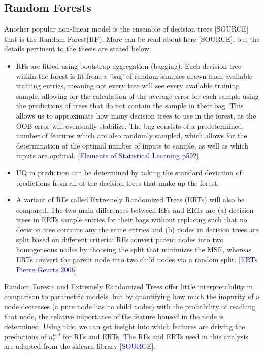 \documentclass[a4paper, twoside, final, 12pt]{article}
\begin{document}
\subsection{Random Forests}
Another popular non-linear model is the ensemble of decision trees [SOURCE] that is the Random Forest(RF). More can be read about here [SOURCE], but the details pertinent to the thesis are stated below:
\begin{itemize}
	\item RFs are fitted using bootstrap aggregation (bagging). Each decision tree within the forest is fit from a 'bag' of random samples drawn from available training entries, meaning not every tree will see every available training sample, allowing for the calculation of the average error for each sample using the predictions of trees that do not contain the sample in their bag. This allows us to approximate how many decision trees to use in the forest, as the OOB error will eventually stabilize. The bag consists of a predetermined number of features which are also randomly sampled, which allows for the determination of the optimal number of inputs to sample, as well as which inputs are optimal.  [\textcolor{blue}{Elements of Statistical Learning p592}]
	\item UQ in prediction can be determined by taking the standard deviation of predictions from all of the decision trees that make up the forest. 
	\item A variant of RFs called Extremely Randomized Trees (ERTs) will also be compared. The two main differences between RFs and ERTs are (a) decision trees in ERTs sample entries for their bags without replacing such that no decision tree contains any the same entries and (b) nodes in decision trees are split based on different criteria; RFs convert parent nodes into two homogeneous nodes by choosing the split that minimizes the MSE, whereas ERTs convert the parent node into two child nodes via a random split. [\textcolor{blue}{ERTs Pierre Geurts 2006}]
\end{itemize}

Random Forests and Extremely Randomized Trees offer little interpretability in comparison to parametric models, but by quantifying how much the impurity of a node decreases (a pure node has no child nodes) with the probability of reaching that node, the relative importance of the feature housed in the node is determined. Using this, we can get insight into which features are driving the predictions of $n_e^{ped}$ for RFs and ERTs. The RFs and ERTs used in this analysis are adapted from the sklearn library [\textcolor{blue}{SOURCE}]. 
\end{document}

